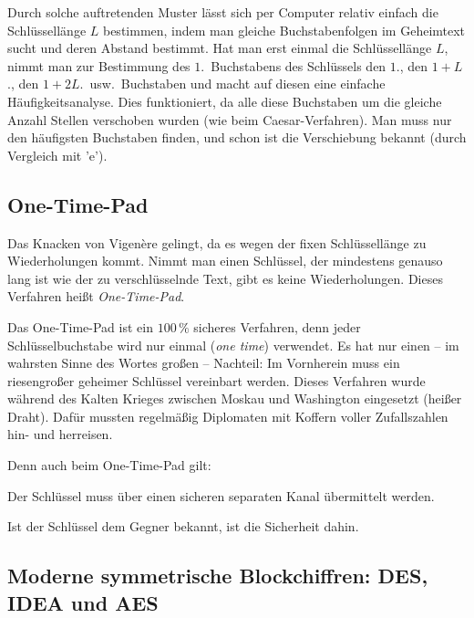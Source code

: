 Durch solche auftretenden Muster lässt sich per Computer relativ einfach die
Schlüssellänge $L$ bestimmen, indem man gleiche Buchstabenfolgen im Geheimtext
sucht und deren Abstand bestimmt. Hat man erst einmal die Schlüssellänge $L$,
nimmt man zur Bestimmung des $1$.~Buchstabens des Schlüssels den $1$., den $1+L$.,
den $1+2L$.\ usw.\ Buchstaben und macht auf diesen eine einfache Häufigkeitsanalyse.
Dies funktioniert, da alle diese Buchstaben um die gleiche Anzahl Stellen
verschoben wurden (wie beim Caesar-Verfahren). Man muss nur den häufigsten
Buchstaben finden, und schon ist die Verschiebung bekannt (durch Vergleich mit
'e').

\subsection{One-Time-Pad}

Das Knacken von Vigenère gelingt, da es wegen der fixen Schlüssellänge zu
Wiederholungen kommt. Nimmt man einen Schlüssel, der mindestens genauso lang ist
wie der zu verschlüsselnde Text, gibt es keine Wiederholungen. Dieses Verfahren
heißt \emph{One-Time-Pad}.

Das One-Time-Pad ist ein $100\,\%$ sicheres Verfahren, denn jeder Schlüsselbuchstabe
wird nur einmal (\emph{one time}) verwendet. Es hat nur einen -- im wahrsten Sinne des
Wortes großen -- Nachteil: Im Vornherein muss ein riesengroßer geheimer
Schlüssel vereinbart werden. Dieses Verfahren wurde während des Kalten Krieges
zwischen Moskau und Washington eingesetzt (\glqq heißer Draht\grqq ). Dafür
mussten regelmäßig Diplomaten mit Koffern voller Zufallszahlen hin- und
herreisen.

Denn auch beim One-Time-Pad gilt:

\begin{compactitem}
\item Der Schlüssel muss über einen sicheren separaten Kanal übermittelt werden.
\item Ist der Schlüssel dem Gegner bekannt, ist die Sicherheit dahin.
\end{compactitem}

\subsection{Moderne symmetrische Blockchiffren: DES, IDEA und AES}

